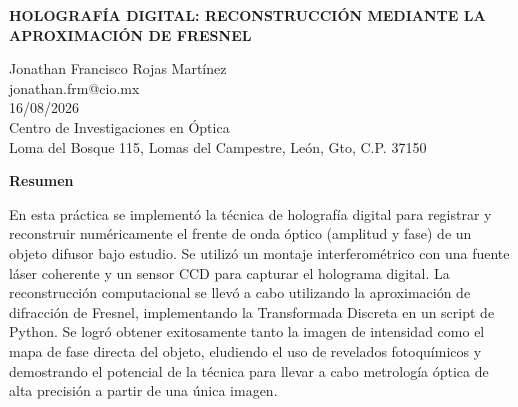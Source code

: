 \documentclass[letterpaper]{article}
\begin{document}
	
	\begin{center}
		\Large \textbf{HOLOGRAFÍA DIGITAL: RECONSTRUCCIÓN MEDIANTE LA APROXIMACIÓN DE FRESNEL}
	\end{center}
	
	\begin{center}
		Jonathan Francisco Rojas Martínez\\
		jonathan.frm@cio.mx\\
		16/08/2026\\
		Centro de Investigaciones en Óptica\\
		Loma del Bosque 115, Lomas del Campestre, León, Gto, C.P. 37150
	\end{center}
	
	\begin{center}
		{\Large \textbf{Resumen}}
	\end{center}
	
	\noindent
	En esta práctica se implementó la técnica de holografía digital para registrar y reconstruir numéricamente el frente de onda óptico (amplitud y fase) de un objeto difusor bajo estudio. Se utilizó un montaje interferométrico con una fuente láser coherente y un sensor CCD para capturar el holograma digital. La reconstrucción computacional se llevó a cabo utilizando la aproximación de difracción de Fresnel, implementando la Transformada Discreta en un script de Python. Se logró obtener exitosamente tanto la imagen de intensidad como el mapa de fase directa del objeto, eludiendo el uso de revelados fotoquímicos y demostrando el potencial de la técnica para llevar a cabo metrología óptica de alta precisión a partir de una única imagen.
	
\end{document}
